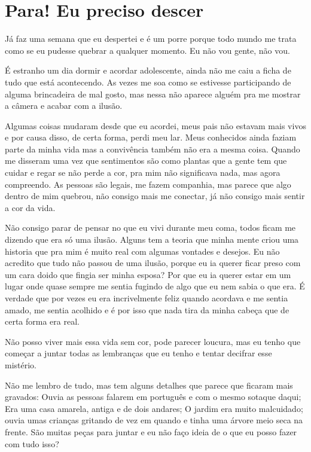 \newpage

\chapter{Para! Eu preciso descer}

Já faz uma semana que eu despertei e é um porre porque todo mundo me trata como se eu pudesse quebrar a qualquer momento. Eu não vou gente, não vou.

É estranho um dia dormir e acordar adolescente, ainda não me caiu a ficha de tudo que está acontecendo. As vezes me soa como se estivesse participando de alguma brincadeira de mal gosto, mas nessa não aparece alguém pra me mostrar a câmera e acabar com a ilusão.

Algumas coisas mudaram desde que eu acordei, meus pais não estavam mais vivos e por causa disso, de certa forma, perdi meu lar. Meus conhecidos ainda faziam parte da minha vida mas a convivência também não era a mesma coisa. Quando me disseram uma vez que sentimentos são como plantas que a gente tem que cuidar e regar se não perde a cor, pra mim não significava nada, mas agora compreendo. As pessoas são legais, me fazem companhia, mas parece que algo dentro de mim quebrou, não consigo mais me conectar, já não consigo mais sentir a cor da vida.

Não consigo parar de pensar no que eu vivi durante meu coma, todos ficam me dizendo que era só uma ilusão. Alguns tem a teoria que minha mente criou uma historia que pra mim é muito real com algumas vontades e desejos. Eu não acredito que tudo não passou de uma ilusão, porque eu ia querer ficar preso com um cara doido que fingia ser minha esposa? Por que eu ia querer estar em um lugar onde quase sempre me sentia fugindo de algo que eu nem sabia o que era. É verdade que por vezes eu era incrivelmente feliz quando acordava e me sentia amado, me sentia acolhido e é por isso que nada tira da minha cabeça que de certa forma era real.

Não posso viver mais essa vida sem cor, pode parecer loucura, mas eu tenho que começar a juntar todas as lembranças que eu tenho e tentar decifrar esse mistério.

Não me lembro de tudo, mas tem alguns detalhes que parece que ficaram mais gravados: Ouvia as pessoas falarem em português e com o mesmo sotaque daqui; Era uma casa amarela, antiga e de dois andares; O jardim era muito malcuidado; ouvia umas crianças gritando de vez em quando e tinha uma árvore meio seca na frente. São muitas peças para juntar e eu não faço ideia de o que eu posso fazer com tudo isso?

